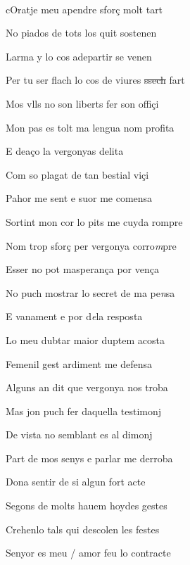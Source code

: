 \documentclass[12pt]{article}
\renewcommand{\espaiAbansEtiquetaPoema}{\vspace{0ex}}
\begin{document}
\begin{estrofa}

\espaiAbansEtiquetaPoema

\\

\end{estrofa}


\begin{estrofa}

 cOratje meu apendre sfor\c{c} molt tart

 No piados de tots los quit sostenen

 Larma y lo cos adepartir se venen

 Per tu ser flach lo cos de viures \sout{ssech} fart

 Mos vlls no son liberts fer son offi\c{c}i

 Mon pas es tolt ma lengua nom profita

 E dea\c{c}o la vergonyas delita

 Com so plagat de tan bestial vi\c{c}i

\end{estrofa}



\begin{estrofa}

 Pahor me sent e suor me comensa

 Sortint mon cor lo pits me cuyda rompre

 Nom trop sfor\c{c} per vergonya corro\textit{m}pre

 Esser no pot masperan\c{c}a por ven\c{c}a

 No puch mostrar lo secret de ma pe\textit{n}sa

 E vanament e por d\textit{e}la resposta

 Lo meu dubtar maior duptem acosta

 Femenil gest ardiment me defensa

\end{estrofa}



\begin{estrofa}

 Alguns an dit que vergonya nos troba

 Mas jon puch fer daquella testimonj

 De vista no semblant es al dimonj

 Part de mos senys e parlar me derroba

 Dona sentir de si algun fort acte

 Segons de molts hauem hoydes gestes

 Crehenlo tals qui descolen les festes

 Senyor es meu / amor feu lo contracte

\end{estrofa}
\end{document}
